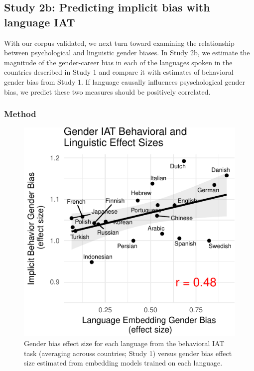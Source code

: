 \documentclass[10pt, letterpaper]{article}
\newenvironment{CodeChunk}{}{}
\begin{document}
\subsection{Study 2b: Predicting implicit bias with language
IAT}\label{study-2b-predicting-implicit-bias-with-language-iat}

With our corpus validated, we next turn toward examining the
relationship between psychological and linguistic gender biases. In
Study 2b, we estimate the magnitude of the gender-career bias in each of
the languages spoken in the countries described in Study 1 and compare
it with estimates of behavioral gender bias from Study 1. If language
causally influences psyschological gender bias, we predict these two
measures should be positively correlated.

\subsubsection{Method}\label{method-2}

\begin{CodeChunk}
\begin{figure}[t]

{\centering \includegraphics{figs/behavior_vs_language_plot-1} 

}

\caption[Gender bias effect size for each language from the behavioral IAT task (averaging acrouss countries]{Gender bias effect size for each language from the behavioral IAT task (averaging acrouss countries; Study 1) versus gender bias effect size estimated from embedding models trained on each language.}\label{fig:behavior_vs_language_plot}
\end{figure}
\end{CodeChunk}
\end{document}

